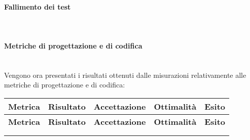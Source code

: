 \paragraph{Fallimento dei test}\mbox{}\\


\paragraph{Metriche di progettazione e di codifica}\mbox{}\\
Vengono ora presentati i risultati ottenuti dalle misurazioni relativamente alle metriche di progettazione e di codifica:
\begin{longtable}{|m{5cm}|c|c|c|c|}
	\hline \multicolumn{1}{|c|}{\textbf{Metrica}} & \multicolumn{1}{c|}{\textbf{Risultato}} & \multicolumn{1}{c|}{\textbf{Accettazione}} & \multicolumn{1}{c|}{\textbf{Ottimalità}} & \multicolumn{1}{c|}{\textbf{Esito}}\\
	\hline 
	\endfirsthead
	
	\hline \multicolumn{1}{|c|}{\textbf{Metrica}} & \multicolumn{1}{c|}{\textbf{Risultato}} & \multicolumn{1}{c|}{\textbf{Accettazione}} & \multicolumn{1}{c|}{\textbf{Ottimalità}} & \multicolumn{1}{c|}{\textbf{Esito}}\\
	\hline 
	\endhead
	
	\hline \multicolumn{5}{|r|}{\ToBeContinued} \\ 
	\hline
	\endfoot
	
	\hline
	\endlastfoot
	

\end{longtable}
